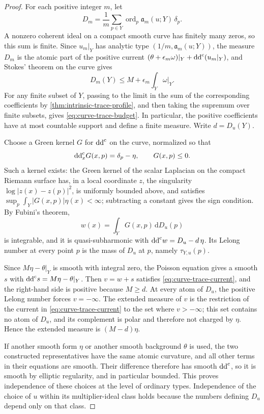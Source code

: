 \begin{proof}
For each positive integer $m$, let
\[
 D_m=\frac1m\sum_{p\in Y}
       \operatorname{ord}_p\mathfrak a_m(u;Y)\,\delta_p.
\]
A nonzero coherent ideal on a compact smooth curve has finitely many zeros, so this sum is finite. Since $u_m|_Y$ has analytic type $(1/m,\mathfrak a_m(u;Y))$, the measure $D_m$ is the atomic part of the positive current
$(\theta+\epsilon_m\omega)|_Y+\mathrm{dd}^{\mathrm{c}}(u_m|_Y)$, and
Stokes' theorem on the curve gives
\[
 D_m(Y)\leq M+\epsilon_m\int_Y\omega|_Y.
\]
For any finite subset of $Y$, passing to the limit in the sum of the corresponding coefficients by \cref{thm:intrinsic-trace-profile}, and then taking the supremum over finite subsets, gives \eqref{eq:curve-trace-budget}. In particular, the positive coefficients have at most countable support and define a finite measure. Write $d=D_u(Y)$.

Choose a Green kernel $G$ for $\mathrm{dd}^{\mathrm{c}}$ on the curve, normalized so that
\[
 \mathrm{dd}^{\mathrm{c}}_xG(x,p)=\delta_p-\eta,\qquad G(x,p)\leq0.
\]
Such a kernel exists: the Green kernel of the scalar Laplacian on the compact Riemann surface has, in a local coordinate $z$, the singularity $\log|z(x)-z(p)|^2$, is uniformly bounded above, and satisfies $\sup_p\int_Y|G(x,p)|\eta(x)<\infty$; subtracting a constant gives the sign condition. By Fubini's theorem,
\[
 w(x)=\int_YG(x,p)\,\mathrm{d}D_u(p)
\]
is integrable, and it is quasi-subharmonic with
$\mathrm{dd}^{\mathrm{c}} w=D_u-d\,\eta$. Its Lelong number at every point $p$ is the mass of $D_u$ at $p$, namely $\tau_{Y,u}(p)$.

Since $M\eta-\theta|_Y$ is smooth with integral zero, the Poisson equation gives a smooth $s$ with $\mathrm{dd}^{\mathrm{c}} s=M\eta-\theta|_Y$. Then $v=w+s$ satisfies \eqref{eq:curve-trace-current}, and the right-hand side is positive because $M\geq d$. At every atom of $D_u$, the positive Lelong number forces $v=-\infty$. The extended measure of $v$ is the restriction of the current in \eqref{eq:curve-trace-current} to the set where $v>-\infty$; this set contains no atom of $D_u$, and its complement is polar and therefore not charged by $\eta$. Hence the extended measure is $(M-d)\eta$.

If another smooth form $\eta$ or another smooth background $\theta$ is used, the two constructed representatives have the same atomic curvature, and all other terms in their equations are smooth. Their difference therefore has smooth $\mathrm{dd}^{\mathrm{c}}$, so it is smooth by elliptic regularity, and in particular bounded. This proves independence of these choices at the level of ordinary types. Independence of the choice of $u$ within its multiplier-ideal class holds because the numbers defining $D_u$ depend only on that class.
\end{proof}

